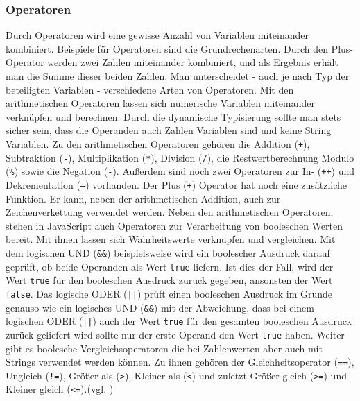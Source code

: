 \subsubsection{Operatoren} \glqq Durch Operatoren wird eine gewisse Anzahl von Variablen miteinander kombiniert. Beispiele für Operatoren sind die Grundrechenarten. Durch den Plus-Operator werden zwei Zahlen miteinander kombiniert, und als Ergebnis erhält man die Summe dieser beiden Zahlen. Man unterscheidet - auch je nach Typ der beteiligten Variablen - verschiedene Arten von Operatoren.\grqq{}\cite[S.69]{WenzJava2008} Mit den arithmetischen Operatoren lassen sich numerische Variablen miteinander verknüpfen und berechnen. Durch die dynamische Typisierung sollte man stets sicher sein, dass die Operanden auch Zahlen Variablen sind und keine String Variablen. Zu den arithmetischen Operatoren gehören die Addition (\texttt{+}), Subtraktion (\texttt{-}), Multiplikation (\texttt{*}), Division (\texttt{/}), die Restwertberechnung Modulo (\texttt{\%}) sowie die Negation (\texttt{-}). Außerdem sind noch zwei Operatoren zur In- (\texttt{++}) und Dekrementation (\texttt{--}) vorhanden. Der Plus (\texttt{+}) Operator hat noch eine zusätzliche Funktion. Er kann, neben der arithmetischen Addition, auch zur Zeichenverkettung verwendet werden. Neben den arithmetischen Operatoren, stehen in JavaScript auch Operatoren zur Verarbeitung von booleschen Werten bereit. Mit ihnen lassen sich Wahrheitswerte verknüpfen und vergleichen. Mit dem logischen UND (\texttt{\&\&}) beispielsweise wird ein boolescher Ausdruck darauf geprüft, ob beide Operanden als Wert \texttt{true} liefern. Ist dies der Fall, wird der Wert \texttt{true} für den booleschen Ausdruck zurück gegeben, ansonsten der Wert \texttt{false}. Das logische ODER (\texttt{||}) prüft einen booleschen Ausdruck im Grunde genauso wie ein logisches UND (\texttt{\&\&}) mit der Abweichung, dass bei einem logischen ODER (\texttt{||}) auch der Wert \texttt{true} für den gesamten booleschen Ausdruck zurück geliefert wird sollte nur der erste Operand den Wert \texttt{true} haben. Weiter gibt es boolesche Vergleichsoperatoren die bei Zahlenwerten aber auch mit Strings verwendet werden können. Zu ihnen gehören der Gleichheitsoperator (\texttt{==}), Ungleich (\texttt{!=}), Größer als (\texttt{\textgreater}), Kleiner als (\texttt{\textless}) und zuletzt Größer gleich (\texttt{\textgreater=}) und Kleiner gleich (\texttt{\textless=}).(vgl. \cite[S.71ff]{WenzJava2008})

